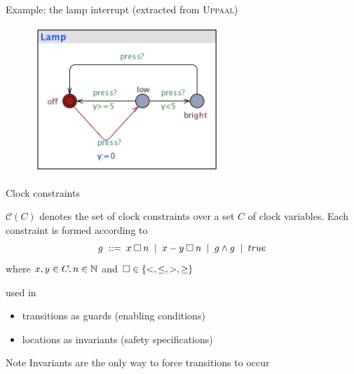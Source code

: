 \documentclass{beamer}
\def\dkb#1{{\blue #1}}
\def\uppaal{\textsc{Uppaal}}
\def\cc#1{\mathcal{C}(#1)}
\begin{document}
\begin{slide}{Example: the lamp interrupt}
\small
(extracted from \uppaal)

\begin{figure}[htb]
  \centering
  \includegraphics[width=7cm]{./images/lamp1.jpg}\\
\end{figure}

\end{slide}


\begin{slide}{Clock constraints}
\small

$\cc{C}$ denotes the  set of clock constraints over a set $C$ of clock variables.
Each constraint is formed according to 
\begin{equation*}
g \; ::=\; x \mathbin{\square} n \; \mid\; x - y \mathbin{\square} n  \; \mid\; g \mathbin{\wedge} g \;\mid\; true
\end{equation*}
where $x,y \in C, n \in \mathbb{N}$ and $\square \in \mathopen{ \{ }<,\leq,>,\geq\mathclose{ \} }$


used in
\begin{itemize}
\item  \dkb{transitions} as \dkb{guards} (enabling conditions)
\item  \dkb{locations} as \dkb{invariants} (safety specifications)
\end{itemize}

\begin{block}{Note}
Invariants are the \dkb{only} way to force transitions to occur
\end{block}
\end{slide}
\end{document}
